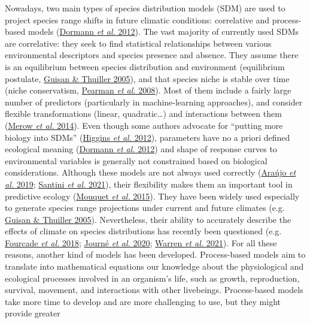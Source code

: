 \documentclass[11pt,]{article}
\begin{document}
Nowadays, two main types of species distribution models (SDM) are used
to project species range shifts in future climatic conditions:
correlative and process-based models
(\protect\hyperlink{ref-Dormann2012}{Dormann \emph{et al.} 2012}). The
vast majority of currently used SDMs are correlative: they seek to find
statistical relationships between various environmental descriptors and
species presence and absence. They assume there is an equilibrium
between species distribution and environment (equilibrium postulate,
\protect\hyperlink{ref-Guisan2005}{Guisan \& Thuiller 2005}), and that
species niche is stable over time (niche conservatism,
\protect\hyperlink{ref-Pearman2008}{Pearman \emph{et al.} 2008}). Most
of them include a fairly large number of predictors (particularly in
machine-learning approaches), and consider flexible transformations
(linear, quadratic\ldots) and interactions between them
(\protect\hyperlink{ref-Merow2014}{Merow \emph{et al.} 2014}). Even
though some authors advocate for ``putting more biology into SDMs''
(\protect\hyperlink{ref-Higgins2012}{Higgins \emph{et al.} 2012}),
parameters have no a priori defined ecological meaning
(\protect\hyperlink{ref-Dormann2012}{Dormann \emph{et al.} 2012}) and
shape of response curves to environmental variables is generally not
constrained based on biological considerations. Although these models
are not always used correctly (\protect\hyperlink{ref-Araujo2019}{Araújo
\emph{et al.} 2019}; \protect\hyperlink{ref-Santini2021}{Santini
\emph{et al.} 2021}), their flexibility makes them an important tool in
predictive ecology (\protect\hyperlink{ref-Mouquet2015}{Mouquet \emph{et
al.} 2015}). They have been widely used especially to generate species
range projections under current and future climates (e.g.
\protect\hyperlink{ref-Guisan2005}{Guisan \& Thuiller 2005}).
Nevertheless, their ability to accurately describe the effects of
climate on species distributions has recently been questioned (e.g.
\protect\hyperlink{ref-Fourcade2018}{Fourcade \emph{et al.} 2018};
\protect\hyperlink{ref-Journe2020}{Journé \emph{et al.} 2020};
\protect\hyperlink{ref-Warren2021}{Warren \emph{et al.} 2021}). For all
these reasons, another kind of models has been developed. Process-based
models aim to translate into mathematical equations our knowledge about
the physiological and ecological processes involved in an organism's
life, such as growth, reproduction, survival, movement, and interactions
with other livebeings. Process-based models take more time to develop
and are more challenging to use, but they might provide greater
\end{document}

